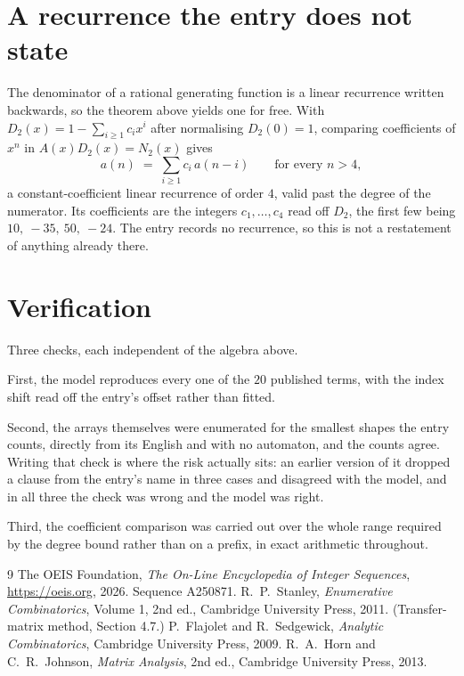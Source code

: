 \documentclass[11pt,a4paper]{article}
\theoremstyle{plain}
\theoremstyle{definition}
\begin{document}
\section{A recurrence the entry does not state}

The denominator of a rational generating function is a linear recurrence written backwards, so
the theorem above yields one for free. With $D_2(x)=1-\sum_{i\ge1}c_ix^i$ after normalising
$D_2(0)=1$, comparing coefficients of $x^n$ in $A(x)D_2(x)=N_2(x)$ gives
\[
a(n)\;=\;\sum_{i\ge1}c_i\,a(n-i)\qquad\text{for every }n>4,
\]
a constant-coefficient linear recurrence of order $4$, valid past the degree of the
numerator. Its coefficients are the integers $c_1,\dots,c_{4}$ read off $D_2$, the first few being $10,\ -35,\ 50,\ -24$. The entry records no recurrence, so this is not a restatement of anything
already there.

\section{Verification}

Three checks, each independent of the algebra above.

First, the model reproduces every one of the $20$ published terms, with the index shift
read off the entry's offset rather than fitted.

Second, the arrays themselves were enumerated for the smallest shapes the entry counts,
directly from its English and with no automaton, and the counts agree. Writing that check is
where the risk actually sits: an earlier version of it dropped a clause from the entry's name
in three cases and disagreed with the model, and in all three the check was wrong and the model
was right.

Third, the coefficient comparison was carried out over the whole range required by the degree
bound rather than on a prefix, in exact arithmetic throughout.

\begin{thebibliography}{9}
 The OEIS Foundation, \emph{The On-Line Encyclopedia of Integer
Sequences}, \url{https://oeis.org}, 2026. Sequence A250871.
 R.~P.~Stanley, \emph{Enumerative Combinatorics}, Volume 1, 2nd ed.,
Cambridge University Press, 2011. (Transfer-matrix method, Section 4.7.)
 P.~Flajolet and R.~Sedgewick, \emph{Analytic Combinatorics}, Cambridge
University Press, 2009.
 R.~A.~Horn and C.~R.~Johnson, \emph{Matrix Analysis}, 2nd ed., Cambridge
University Press, 2013.
\end{thebibliography}
\end{document}
